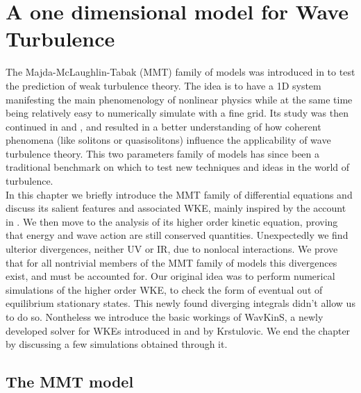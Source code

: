 

\newpage
\phantom{}
\thispagestyle{empty}
\section{A one dimensional model for Wave Turbulence}
    The Majda-McLaughlin-Tabak (MMT) family of models was introduced in \cite{Majda1997} to test the prediction of weak turbulence theory. The idea is to have a 1D system manifesting
    the main phenomenology of nonlinear physics while at the same time being relatively easy to numerically simulate with a fine grid. Its study was then continued in
    \cite{Cai2001} and \cite{Zakharov2001}, and resulted in a better understanding of how coherent phenomena (like solitons or quasisolitons) influence the applicability 
    of wave turbulence theory. This two parameters family of models has since been a traditional benchmark on which to test new techniques and ideas in the world of turbulence. \\
    In this chapter we briefly introduce the MMT family of differential equations and discuss its salient features and associated WKE, mainly inspired by the account in 
    \cite{ZAKHAROV2004}. We then 
    move to the analysis of its higher order kinetic equation, proving that energy and wave action are still conserved quantities. Unexpectedly  we find 
    ulterior divergences, neither UV or IR, due to nonlocal interactions. We prove that for all nontrivial members of the MMT family of
    models this divergences exist, and must be accounted for. Our original idea was to perform numerical simulations of the higher order WKE, to check the form of eventual out of equilibrium stationary states. This newly found diverging integrals didn't allow us to do so. Nontheless we introduce the basic workings of WavKinS,
    a newly developed solver for WKEs introduced in \cite{Giorgio1} and \cite{Giorgio2} by Krstulovic. We end the chapter by discussing a few simulations obtained 
    through it. \\  
    \subsection{The MMT model}

